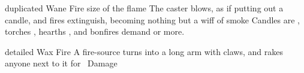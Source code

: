   {duplicated}%
  {Wane}%
  {Fire}%
  {size of the flame}%
  {The caster blows, as if putting out a candle, and  fires extinguish, becoming nothing but a wiff of smoke}%
  {Candles are \tn[6], torches \tn[7], hearths \tn[8], and bonfires demand \tn[9] or more.}

  {detailed}%
  {Wax}%
  {Fire}%
  {}%
  {A fire-source turns into a long arm with claws, and rakes anyone next to it for \showDam~Damage}%
  {}

